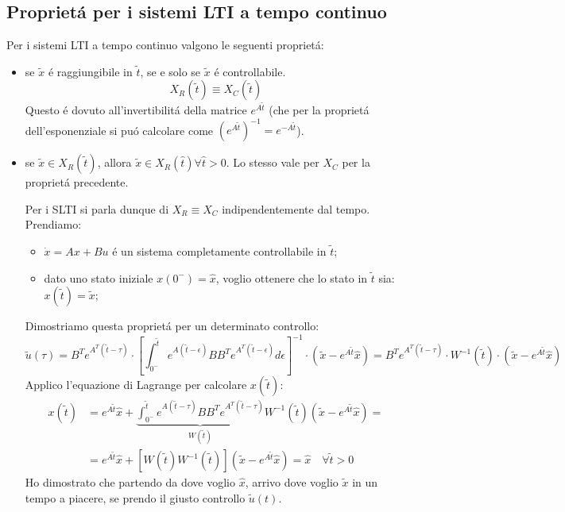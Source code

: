 \documentclass[../main.tex]{subfiles}
\begin{document}
	\subsection{Propriet\'a per i sistemi LTI a tempo continuo}
		Per i sistemi LTI a tempo continuo valgono le seguenti propriet\'a:
		\begin{itemize}
			\item
				se $ \tilde x $ \'e raggiungibile in $ \tilde t $, se e solo se $ \tilde x $ \'e controllabile.
				\[ X_R(\tilde t) \equiv X_C(\tilde t) \]
				Questo \'e dovuto all'invertibilit\'a della matrice $ e^{A \tilde t} $ (che per la propriet\'a dell'esponenziale si pu\'o calcolare come $ \left( e^{A \tilde t} \right)^{-1} = e^{-A \tilde t} $).
				
			\item
				se $ \tilde x \in X_R(\tilde t) $, allora $ \tilde x \in X_R(\hat t) \forall \hat t > 0 $.
				Lo stesso vale per $ X_C $ per la propriet\'a precedente.
				
				Per i SLTI si parla dunque di $ X_R \equiv X_C $ indipendentemente dal tempo.\\
				Prendiamo:
				\begin{itemize}
					\item
						$ \dot x = A x + B u $ \'e un sistema completamente controllabile in $ \tilde t $;
					\item
						dato uno stato iniziale $ x(0^-) = \hat x $, voglio ottenere che lo stato in $ \tilde t $ sia: $ x(\tilde t) = \tilde x $;
				\end{itemize}
				Dimostriamo questa propriet\'a per un determinato controllo:
				\[ \tilde u(\tau) = B^T e^{A^T (\tilde t - \tau)} \cdot \left[ \int_{0^-}^{\tilde t} e^{A(\tilde t - \epsilon)} B B^T e^{A^T (\tilde t - \epsilon)} d\epsilon \right]^{-1} \cdot \left( \tilde x - e^{A \tilde t} \hat x \right) = B^T e^{A^T (\tilde t - \tau)} \cdot W^{-1}(\tilde t) \cdot \left( \tilde x - e^{A \tilde t} \hat x \right) \]
				Applico l'equazione di Lagrange per calcolare $ x(\tilde t) $:
				\begin{align*}
					x(\tilde t) &= e^{A \tilde t} \hat x + \underbrace{\int_{0^-}^{\tilde t} e^{A(\tilde t - \tau)} B B^T e^{A^T (\tilde t - \tau)}}_{W(\tilde t)} W^{-1}(\tilde t) \left( \tilde x - e^{A \tilde t} \hat x \right) =\\
					&= e^ {A \tilde t} \hat x + \left[ W(\tilde t) W^{-1}(\tilde t) \right] \left( \tilde x - e^{A \tilde t} \hat x \right) = \hat x \quad \forall \tilde t > 0
				\end{align*}
				Ho dimostrato che partendo da dove voglio $ \hat x $, arrivo dove voglio $ \tilde x $ in un tempo a piacere, se prendo il giusto controllo $ \tilde u(t) $.
		\end{itemize}
	
\end{document}

